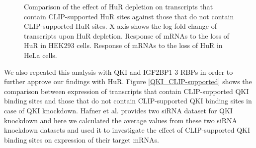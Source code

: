 \clearpage
\begin{figure}[H]
	\centering
\quad
\caption[Comparison between CLIP-supported HuR sites and Other sites]{Comparison of the effect of HuR depletion on transcripts that contain CLIP-supported HuR sites against those that do not contain CLIP-supported HuR sites. X axis shows the log fold change of transcripts upon HuR depletion.  Response of mRNAs to the loss of HuR in HEK293 cells.  Response of mRNAs to the loss of HuR in HeLa cells. }
\label{HuR_CLIPsupport}
\end{figure}

We also repeated this analysis with QKI and IGF2BP1-3 RBPs in order to further approve our findings with HuR. Figure \ref{QKI_CLIP-supported} shows the comparison between expression of transcripts that contain CLIP-supported QKI binding sites and those that do not contain CLIP-supported QKI binding sites in case of QKI knockdown. Hafner et al. \cite{hafner_10} provides two siRNA dataset for QKI knockdown and here we calculated the average values from these two siRNA knockdown datasets and used it to investigate the effect of CLIP-supported QKI binding sites on expression of their target mRNAs. 

